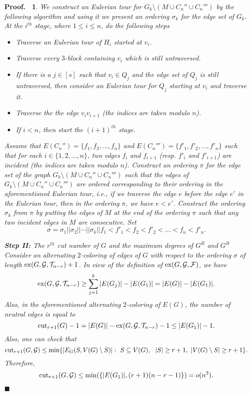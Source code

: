 \documentclass[11pt]{article}
\newtheorem{preproof}{{\bf Proof.\ }}
\newenvironment{proof}[1]{\begin{preproof}{\rm
               #1}\hfill{$\blacksquare$}}{\end{preproof}}
\begin{document}
\begin{proof}
{We construct an Eulerian tour for $G_k\setminus (M\cup C_n''\cup C_n''')$ 
by the following algorithm and using it we present
an ordering $\sigma_k$ for the edge set of $G_k$.
At the $i^{th}$ stage, where $1\leq i \leq n$, do the following steps
\begin{itemize}
\item Traverse an Eulerian tour of $H_i$ started at $v_i$.
\item Traverse every $3$-block containing $v_i$ which is still untraversed.
\item If there is a $j\in[s]$ such that $v_i\in Q_j$ and the edge set of $Q_j$ is still untraversed, then consider 
an Eulerian tour for $Q_j$ starting at $v_i$ and traverse it.
\item Traverse the the edge $v_iv_{i+1}$ (the indices are taken modulo $n$).
\item If $i<n$, then start the $(i+1)^{th}$ stage. 
\end{itemize}

Assume that $E(C_n'')=\{f_1,f_2,\ldots,f_n\}$ and $E(C_n''')=\{f'_1,f'_2,\ldots,f'_n\}$ such that
for each $i\in\{1,2,\ldots,n\}$, two edges $f_i$ and $f_{i+1}$ (resp. $f'_i$ and $f'_{i+1}$)
are incident (the indices are taken modulo $n$).  
Construct an ordering $\pi$ for the edge set of the graph $G_k\setminus (M\cup C_n''\cup C_n''')$
such that the edges of $G_k\setminus (M\cup C_n''\cup C_n''')$ are ordered 
corresponding to their ordering in the aforementioned Eulerian tour, i.e.,
if we traverse the edge $e$ before the edge 
$e'$ in the Eulerian tour, then in the ordering $\pi$, we have $e<e'$.
Construct the ordering $\sigma_k$ from $\pi$ by putting the edges of $M$ at the end of the ordering $\pi$  such that any two incident edges in $M$ are consecutive.
Set 
$$\sigma=\sigma_1||\sigma_2||\cdots||\sigma_k||f_1<f'_1<f_2<f'_2<\ldots<f_n<f'_n.$$

{\bf Step II:} The $r^{th}$ cut number of $G$ and the maximum degrees of $G^R$ and $G^B$\\
Consider an alternating $2$-coloring of edges of $G$ with respect to the ordering $\sigma$ of length 
${\rm ex}(G,{\cal G},{\cal T}_{n-r})+1$. 
In view of the definition of ${\rm ex}(G, {\cal G}, {\cal F})$, we have 
$${\rm ex}(G, {\cal G}, {\cal T}_{n-r})\geq \sum_{j=1}^k|E(G_j)|-|E(G_1)|=|E(G)|-|E(G_1)|.$$
Also, in the aforementioned alternating $2$-coloring of $E(G)$, the number of neutral edges is equal to 
$${\rm cut}_{r+1}(G)-1=|E(G)|-{\rm ex}(G, {\cal G}, {\cal T}_{n-r})-1\leq |E(G_1)|-1.$$
Also, one can check that 
$${\rm cut}_{r+1}(G,{\cal G})\leq \min\{|E_G(S,V(G)\setminus S)|:\ S\subseteq V(G),\ \ |S|\geq r+1,\ |V(G)\setminus S|\geq r+1 \}.$$
Therefore, 
$${\rm cut}_{r+1}(G,{\cal G})\leq \min(\displaystyle\{|E(G_1)|,  (r+1)(n-r-1)\})=o(n^2).$$

}
\end{proof}
\end{document}
